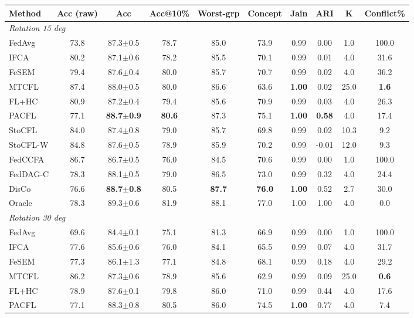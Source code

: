 \scriptsize
\setlength{\tabcolsep}{3.2pt}
\begin{tabular}{lccccccccc}
\toprule
Method & Acc (raw) & Acc & Acc@10\% & Worst-grp & Concept & Jain & ARI & K & Conflict\% \\
\midrule
\multicolumn{10}{l}{\textit{Rotation 15 deg}}\\
FedAvg & 73.8 & 87.3$\pm$0.5 & 78.7 & 85.0 & 73.9 & 0.99 & 0.00 & 1.0 & 100.0 \\
IFCA & 80.2 & 87.1$\pm$0.6 & 78.2 & 85.5 & 70.1 & 0.99 & 0.01 & 4.0 & 31.6 \\
FeSEM & 79.4 & 87.6$\pm$0.4 & 80.0 & 85.7 & 70.7 & 0.99 & 0.02 & 4.0 & 36.2 \\
MTCFL & 87.4 & 88.0$\pm$0.5 & 80.0 & 86.6 & 63.6 & \textbf{1.00} & 0.02 & 25.0 & \textbf{1.6} \\
FL+HC & 80.9 & 87.2$\pm$0.4 & 79.4 & 85.6 & 70.9 & 0.99 & 0.03 & 4.0 & 26.3 \\
PACFL & 77.1 & \textbf{88.7$\pm$0.9} & \textbf{80.6} & 87.3 & 75.1 & \textbf{1.00} & \textbf{0.58} & 4.0 & 17.4 \\
StoCFL & 84.0 & 87.4$\pm$0.8 & 79.0 & 85.7 & 69.8 & 0.99 & 0.02 & 10.3 & 9.2 \\
StoCFL-W & 84.8 & 87.6$\pm$0.5 & 78.9 & 85.9 & 70.2 & 0.99 & -0.01 & 12.0 & 9.3 \\
FedCCFA & 86.7 & 86.7$\pm$0.5 & 76.0 & 84.5 & 70.6 & 0.99 & 0.00 & 1.0 & 100.0 \\
FedDAG-C & 78.3 & 88.1$\pm$0.5 & 79.0 & 86.5 & 73.0 & 0.99 & 0.32 & 4.0 & 24.4 \\
DisCo & 76.6 & \textbf{88.7$\pm$0.8} & 80.5 & \textbf{87.7} & \textbf{76.0} & \textbf{1.00} & 0.52 & 2.7 & 30.0 \\
Oracle & 78.3 & 89.3$\pm$0.6 & 81.9 & 88.1 & 77.0 & 1.00 & 1.00 & 4.0 & 0.0 \\
\midrule
\multicolumn{10}{l}{\textit{Rotation 30 deg}}\\
FedAvg & 69.6 & 84.4$\pm$0.1 & 75.1 & 81.3 & 66.9 & 0.99 & 0.00 & 1.0 & 100.0 \\
IFCA & 77.6 & 85.6$\pm$0.6 & 76.0 & 84.1 & 65.5 & 0.99 & 0.07 & 4.0 & 31.7 \\
FeSEM & 77.3 & 86.1$\pm$1.3 & 77.1 & 84.8 & 68.1 & 0.99 & 0.18 & 4.0 & 29.2 \\
MTCFL & 86.2 & 87.3$\pm$0.6 & 78.9 & 85.6 & 62.9 & 0.99 & 0.09 & 25.0 & \textbf{0.6} \\
FL+HC & 78.9 & 87.6$\pm$0.1 & 79.8 & 86.0 & 71.0 & 0.99 & 0.44 & 4.0 & 17.6 \\
PACFL & 77.1 & 88.3$\pm$0.8 & 80.5 & 86.0 & 74.5 & \textbf{1.00} & 0.77 & 4.0 & 7.4 \\

\end{tabular}
